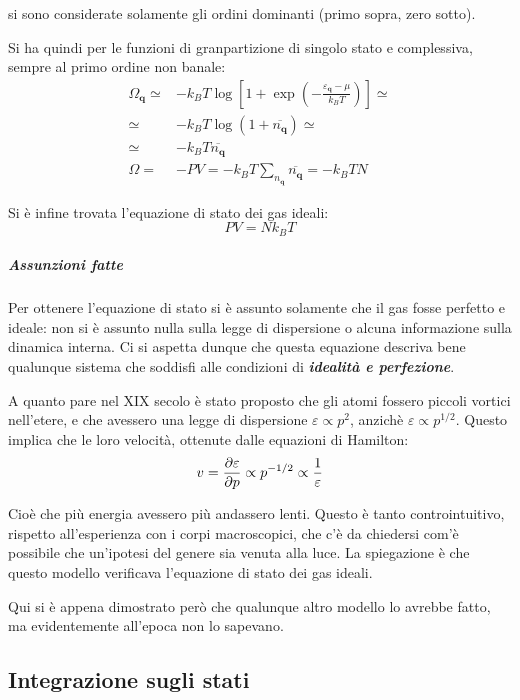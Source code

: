 \noindent si sono considerate solamente gli ordini dominanti (primo sopra, zero sotto).

Si ha quindi per le funzioni di granpartizione di singolo stato e complessiva, sempre al primo ordine non banale:
\begin{align*}
\Omega_{\textbf{q}} \simeq& - k_B T \log \left[ 1 + \exp \left( - \frac{{\varepsilon_{\textbf{q}} - \mu}}{k_B T}\right)\right] \simeq\\
\simeq&- k_B T \log (1 + \overline{n_{\textbf{q}}}) \simeq\\
\simeq&-k_B T \overline{n_{\textbf{q}}}\\
\Omega =& - P V = - k_B T \sum_{n_{\textbf{q}}} \overline{n_{\textbf{q}}}= - k_B T N
\end{align*}

Si è infine trovata l'equazione di stato dei gas ideali:
\begin{equation*}
P V = N k_B T
\end{equation*}

\subparagraph{Assunzioni fatte} Per ottenere l'equazione di stato si è assunto solamente che il gas fosse perfetto e ideale: non si è assunto nulla sulla legge di dispersione o alcuna informazione sulla dinamica interna. Ci si aspetta dunque che questa equazione descriva bene qualunque sistema che soddisfi alle condizioni di \textbf{\textit{idealità e perfezione}}.
\newline

A quanto pare nel XIX secolo è stato proposto che gli atomi fossero piccoli vortici nell'etere, e che avessero una legge di dispersione $\varepsilon \propto p^2$, anzichè $\varepsilon \propto p^{1/2}$. Questo implica che le loro velocità, ottenute dalle equazioni di Hamilton:
\begin{equation*}
v = \frac{\partial {\varepsilon}}{\partial {p}} \propto p^{-1/2} \propto \frac{1}{\varepsilon}
\end{equation*}

Cioè che più energia avessero più andassero lenti. Questo è tanto controintuitivo, rispetto all'esperienza con i corpi macroscopici, che c'è da chiedersi com'è possibile che un'ipotesi del genere sia venuta alla luce. La spiegazione è che questo modello verificava l'equazione di stato dei gas ideali.

Qui si è appena dimostrato però che qualunque altro modello lo avrebbe fatto, ma evidentemente all'epoca non lo sapevano.

\subsection{Integrazione sugli stati}
\label{sec:sumasint}

